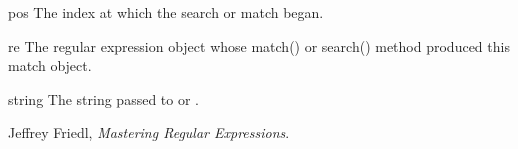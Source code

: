 \begin{datadesc}{pos}
The index at which the search or match began.
\end{datadesc}

\begin{datadesc}{re}
The regular expression object whose match() or search() method
produced this match object. 
\end{datadesc}

\begin{datadesc}{string}
The string passed to  or .
\end{datadesc}



\begin{seealso}
\seetext Jeffrey Friedl, \emph{Mastering Regular Expressions}.
\end{seealso}


